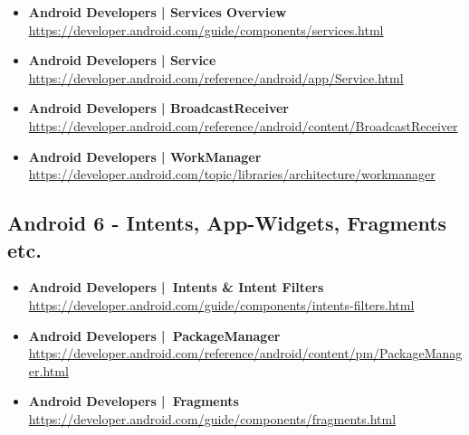 \documentclass[a4paper]{article}
\begin{document}
{\begin{itemize}
		\item \textbf{Android Developers | Services Overview}\\
		\href{https://developer.android.com/guide/components/services.html}
		{https://developer.android.com/guide/components/services.html}
		
		\item \textbf{Android Developers | Service}\\
		\href{https://developer.android.com/reference/android/app/Service.html}
		{https://developer.android.com/reference/android/app/Service.html}		
		
		\item \textbf{Android Developers | BroadcastReceiver}\\
		\href{https://developer.android.com/reference/android/content/BroadcastReceiver}
		{https://developer.android.com/reference/android/content/BroadcastReceiver}	
		
		\item \textbf{Android Developers | WorkManager}\\
		\href{https://developer.android.com/topic/libraries/architecture/workmanager}
		{https://developer.android.com/topic/libraries/architecture/workmanager}			
		
	\end{itemize}
	
	\subsection{Android 6 - Intents, App-Widgets, Fragments etc.}
	
	\begin{itemize}
		
		\item \textbf{Android Developers | Intents \& Intent Filters}\\
		\href{https://developer.android.com/guide/components/intents-filters.html}
		{https://developer.android.com/guide/components/intents-filters.html}
		
		\item \textbf{Android Developers | PackageManager}\\
		\href{https://developer.android.com/reference/android/content/pm/PackageManager.html}
		{https://developer.android.com/reference/android/content/pm/PackageManager.html}
		
		\item \textbf{Android Developers | Fragments}\\
		\href{https://developer.android.com/guide/components/fragments.html}
		{https://developer.android.com/guide/components/fragments.html}
		

\end{itemize}}
\end{document}
